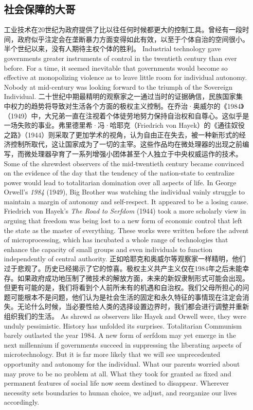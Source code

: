 \subsection{社会保障的大哥}
\begin{paracol}{2}
工业技术在20世纪为政府提供了比以往任何时候都更大的控制工具。曾经有一段时间，政府似乎注定会在垄断暴力方面变得如此有效，以至于个体自治的空间很小。半个世纪以来，没有人期待主权个体的胜利。
\switchcolumn
Industrial technology gave governments greater instruments of control in the twentieth century than ever before. For a time, it seemed inevitable that governments would become so effective at monopolizing violence as to leave little room for individual autonomy. Nobody at mid-century was looking forward to the triumph of the Sovereign Individual.
\switchcolumn*
二十世纪中期最精明的观察家之一通过当时的证据确信，民族国家集中权力的趋势将导致对生活各个方面的极权主义控制。在乔治·奥威尔的《1984》（1949）中，大兄弟一直在注视着个体徒劳地努力保持自治权和自尊心。这似乎是一场失败的事业。弗里德里希·冯·哈耶克（Friedrich von Hayek）的《通往奴役之路》（1944）则采取了更加学术的视角，认为自由正在失去，被一种新形式的经济控制所取代，这让国家成为了一切的主宰。这些作品均在微处理器的出现之前编写，而微处理器孕育了一系列增强小团体甚至个人独立于中央权威运作的技术。
\switchcolumn
Some of the shrewdest observers of the mid-twentieth century became convinced on the evidence of the day that the tendency of the nation-state to centralize power would lead to totalitarian domination over all aspects of life. In George Orwell's \emph{1984} (1949), Big Brother was watching the individual vainly struggle to maintain a margin of autonomy and self-respect. It appeared to be a losing cause. Friedrich von Hayek's \emph{The Road to Serfdom} (1944) took a more scholarly view in arguing that freedom was being lost to a new form of economic control that left the state as the master of everything. These works were written before the advent of microprocessing, which has incubated a whole range of technologies that enhance the capacity of small groups and even individuals to function independently of central authority.
\switchcolumn*
正如哈耶克和奥威尔等观察家一样精明，他们过于悲观了。历史已经揭示了它的惊喜。极权主义共产主义仅在1984年之后未能幸存。如果政府成功地压制了微技术的解放方面，未来的新奴隶制形式可能会出现。但更有可能的是，我们将看到个人前所未有的机遇和自治权。我们父母所担心的问题可能根本不是问题，他们认为是社会生活的固定和永久特征的事情现在注定会消失。无论什么时候，当必要性给人类的选择设置边界时，我们都会进行调整并重新组织我们的生活。
\switchcolumn
As shrewd as observers like Hayek and Orwell were, they were unduly pessimistic. History has unfolded its surprises. Totalitarian Communism barely outlasted the year 1984. A new form of serfdom may yet emerge in the next millennium if governments succeed in suppressing the liberating aspects of microtechnology. But it is far more likely that we will see unprecedented opportunity and autonomy for the individual. What our parents worried about may prove to be no problem at all. What they took for granted as fixed and permanent features of social life now seem destined to disappear. Wherever necessity sets boundaries to human choice, we adjust, and reorganize our lives accordingly.
\end{paracol}

